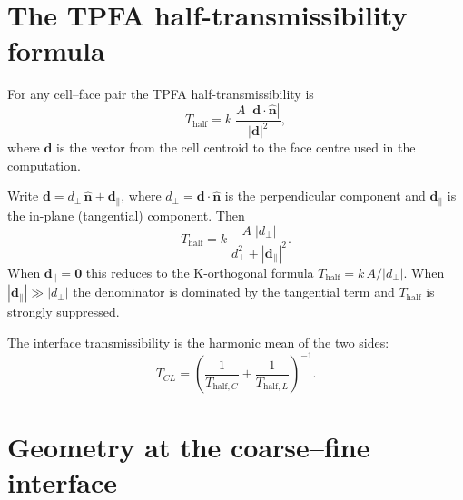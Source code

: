 \documentclass[11pt,a4paper]{article}
\begin{document}
\section{The TPFA half-transmissibility formula}

For any cell--face pair the TPFA half-transmissibility is
\begin{equation}
  T_{\text{half}} = k\;\frac{A\;|\mathbf{d}\cdot\hat{\mathbf{n}}|}{|\mathbf{d}|^{2}},
  \label{eq:halftrans}
\end{equation}
where $\mathbf{d}$ is the vector from the cell centroid to the face
centre used in the computation.

Write $\mathbf{d} = d_\perp\,\hat{\mathbf{n}} + \mathbf{d}_\parallel$,
where $d_\perp = \mathbf{d}\cdot\hat{\mathbf{n}}$ is the perpendicular
component and $\mathbf{d}_\parallel$ is the in-plane (tangential)
component.  Then
\begin{equation}
  T_{\text{half}} = k\;\frac{A\;|d_\perp|}{d_\perp^2 + |\mathbf{d}_\parallel|^2}.
  \label{eq:halftrans_decomp}
\end{equation}
When $\mathbf{d}_\parallel = \mathbf{0}$ this reduces to
the K-orthogonal formula $T_{\text{half}} = k\,A/|d_\perp|$.
When $|\mathbf{d}_\parallel| \gg |d_\perp|$ the denominator is dominated
by the tangential term and $T_{\text{half}}$ is strongly suppressed.

The interface transmissibility is the harmonic mean of the two sides:
\begin{equation}
  T_{CL} = \left(\frac{1}{T_{\text{half},C}} + \frac{1}{T_{\text{half},L}}\right)^{-1}.
\end{equation}

\section{Geometry at the coarse--fine interface}
\end{document}
